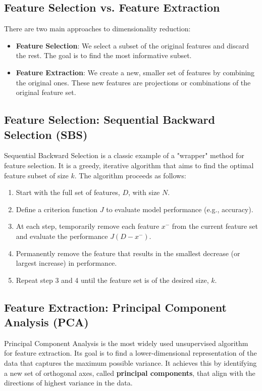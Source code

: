 \subsection*{Feature Selection vs. Feature Extraction}
There are two main approaches to dimensionality reduction:
\begin{itemize}
    \item \textbf{Feature Selection}: We select a subset of the original features and discard the rest. The goal is to find the most informative subset.
    \item \textbf{Feature Extraction}: We create a new, smaller set of features by combining the original ones. These new features are projections or combinations of the original feature set.
\end{itemize}

\subsection*{Feature Selection: Sequential Backward Selection (SBS)}
Sequential Backward Selection is a classic example of a "wrapper" method for feature selection. It is a greedy, iterative algorithm that aims to find the optimal feature subset of size $k$.
The algorithm proceeds as follows:
\begin{enumerate}
    \item Start with the full set of features, $D$, with size $N$.
    \item Define a criterion function $J$ to evaluate model performance (e.g., accuracy).
    \item At each step, temporarily remove each feature $x^-$ from the current feature set and evaluate the performance $J(D - x^-)$.
    \item Permanently remove the feature that results in the smallest decrease (or largest increase) in performance.
    \item Repeat step 3 and 4 until the feature set is of the desired size, $k$.
\end{enumerate}

\subsection*{Feature Extraction: Principal Component Analysis (PCA)}
Principal Component Analysis is the most widely used unsupervised algorithm for feature extraction. Its goal is to find a lower-dimensional representation of the data that captures the maximum possible variance. It achieves this by identifying a new set of orthogonal axes, called \textbf{principal components}, that align with the directions of highest variance in the data.

